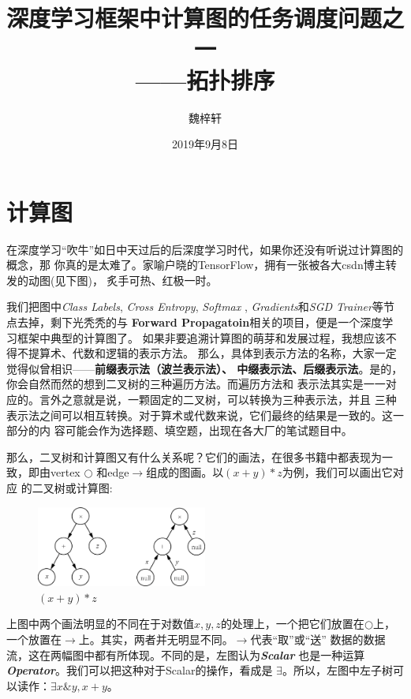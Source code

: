 \documentclass[12pt, a4paper]{article}
\begin{document}
\title{深度学习框架中计算图的任务调度问题之一\\——\textbf{拓扑排序}}
\author{魏梓轩}
\date{2019年9月8日}
\maketitle

\section{计算图}
在深度学习“吹牛”如日中天过后的后深度学习时代，如果你还没有听说过计算图的概念，那
你真的是太难了。家喻户晓的TensorFlow，拥有一张被各大csdn博主转发的动图(见下图)，
炙手可热、红极一时。

\begin{center}
\end{center}

我们把图中\textit{Class Labels}, \textit{Cross Entropy}, \textit{Softmax}
, \textit{Gradients}和\textit{SGD Trainer}等节点去掉，剩下光秃秃的与
\textbf{Forward Propagatoin}相关的项目，便是一个深度学习框架中典型的计算图了。
如果非要追溯计算图的萌芽和发展过程，我想应该不得不提算术、代数和逻辑的表示方法。
那么，具体到表示方法的名称，大家一定觉得似曾相识——\textbf{前缀表示法（波兰表示法）、
中缀表示法、后缀表示法}。是的，你会自然而然的想到二叉树的三种遍历方法。而遍历方法和
表示法其实是一一对应的。言外之意就是说，一颗固定的二叉树，可以转换为三种表示法，并且
三种表示法之间可以相互转换。对于算术或代数来说，它们最终的结果是一致的。这一部分的内
容可能会作为选择题、填空题，出现在各大厂的笔试题目中。

那么，二叉树和计算图又有什么关系呢？它们的画法，在很多书籍中都表现为一致，即由vertex
$\bigcirc$ 和edge$\rightarrow$组成的图画。以$(x+y)*z$为例，我们可以画出它对应
的二叉树或计算图:

\begin{figure}[h!]
  \centering
  \includegraphics[width=0.5\textwidth]{assets/tree.png}
  \caption{$(x+y)*z$}
\end{figure}

上图中两个画法明显的不同在于对数值$x,y,z$的处理上，一个把它们放置在$\bigcirc$上，
一个放置在$\rightarrow$上。其实，两者并无明显不同。$\rightarrow$代表“取”或“送”
数据的数据流，这在两幅图中都有所体现。不同的是，左图认为\textbf{\textit{Scalar}}
也是一种运算\textbf{\textit{Operator}}。我们可以把这种对于Scalar的操作，看成是
$\exists$。所以，左图中左子树可以读作：$\exists x \& y, x+y$。
\end{document}
